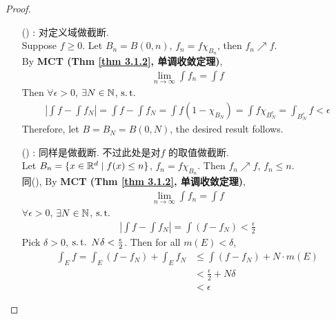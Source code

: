\begin{proposition}
 		\newpage
 		\begin{proof}
 			\begin{enumerate}
 				\item[(\rmnum{1})]: 对定义域做截断.\\
 				Suppose $f \geq 0$. Let $B_n = B(0 , n)$, $f_n = f \chi_{B_n}$, then $f_n \nearrow f$. \\
 				By \textbf{MCT (Thm \ref{thm 3.1.2}, 单调收敛定理)}, 
 				\begin{align}
 					\lim_{n \to \infty}{\int{f_n}} = \int{f}
 				\end{align}
 				Then $\forall \epsilon > 0$, $\exists N \in \mathbb{N}$, $\operatorname{s.t.}$
 				\begin{align}
 					\left| \int{f} - \int{f_N} \right| 
 					= \int{f} - \int{f_N}
 					= \int{f(1 - \chi_{B_N})}
 					= \int{f \chi_{B_{N}^{c}}}
 					= \int_{B_{N}^c}{f}
 					< \epsilon
 				\end{align}
 				Therefore, let $B = B_N = B(0 , N)$, the desired result follows.
 				
 				\vspace{2em}
 				
 				\item[(\rmnum{2})]: 同样是做截断. 不过此处是对$f$ 的取值做截断. \\
 				Let $B_n = \{ x \in \mathbb{R}^d \mid f(x) \leq n \}$, $f_n = f \chi_{B_n}$. Then $f_n \nearrow f$, $f_n \leq n$.\\
 				同(), By \textbf{MCT (Thm \ref{thm 3.1.2}, 单调收敛定理)},
 				\begin{align}
 					\lim_{n \to \infty}{\int{f_n}} = \int{f}
 				\end{align}
 				$\forall \epsilon > 0$, $\exists N \in \mathbb{N}$, $\operatorname{s.t.}$
 				\begin{align}
 					\left| \int{f} - \int{f_N} \right|
 					= \int{(f - f_N)}
 					< \frac{\epsilon}{2}
 				\end{align}
 				Pick $\delta > 0$, $\operatorname{s.t.} \,\, N\delta < \frac{\epsilon}{2}$. Then for all $m(E) < \delta$,
 				\begin{align}
 					\int_{E}{f}
 					= \int_{E}{(f - f_N)} + \int_{E}{f_N}
 					&\leq \int{(f - f_N)} + N \cdot m(E) \\
 					&< \frac{\epsilon}{2} + N \delta \\
 					&< \epsilon
 				\end{align}
 			\end{enumerate}
 		\end{proof}
 	\end{proposition}
 
